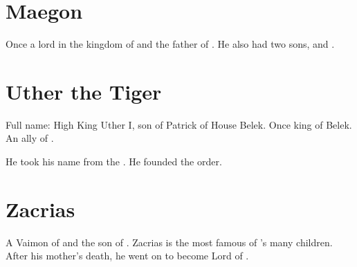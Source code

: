 \section{Maegon \Delaen}
Once a lord in the kingdom of \Imrath{} and the father of . 
He also had two sons,  and . 















\section{Uther the Tiger}
Full name: High King Uther I, son of Patrick of House Belek. 
Once king of Belek. 
An ally of . 

He took his name from the . 
He founded the  order. 















\section{Zacrias}
A Vaimon of \ClanGeican and the son of \Belzir. 
Zacrias is the most famous of \Belzir's many children. 
After his mother's death, he went on to become Lord of \ClanGeican. 










